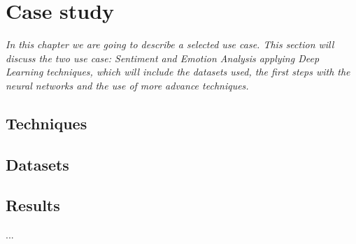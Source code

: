 \chapter{Case study}
\label{chap:case-study}

\textit{In this chapter we are going to describe a selected use case. This section will discuss the two use case: Sentiment and Emotion Analysis applying Deep Learning techniques, which will include the datasets used, the first steps with the neural networks and the use of more advance techniques.}

\clearpage

\section{Techniques}

\section{Datasets}

\section{Results}
...
